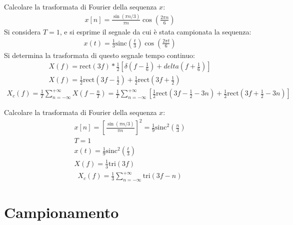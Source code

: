 \documentclass{article}
\newcommand{\rect}{\mbox{rect}}
\newcommand{\sinc}{\mbox{sinc}}
\begin{document}
Calcolare la trasformata di Fourier della sequenza $x$:
\begin{gather*}
    x[n]=\displaystyle\frac{\sin(\pi n/3)}{\pi n}\cos\left(\frac{2\pi n}{6}\right)
\end{gather*}
Si considera $T=1$, e si esprime il segnale da cui è stata campionata la sequenza:
\begin{gather*}
    x(t)=\frac{1}{3}\sinc\left(\frac{t}{3}\right)\cos\left(\frac{2\pi t}{6}\right)
\end{gather*}
Si determina la trasformata di questo segnale tempo continuo:
\begin{gather*}
    X(f)=\displaystyle\rect(3f)*\frac{1}{2}\left[\delta\left(f-\frac{1}{6}\right)+delta\left(f+\frac{1}{6}\right)\right]\\
    X(f)=\displaystyle\frac{1}{2}\rect\left(3f-\frac{1}{2}\right)+\frac{1}{2}\rect\left(3f+\frac{1}{2}\right)
\end{gather*}
\begin{gather}
    X_c(f)=\displaystyle\frac{1}{T}\sum_{n=-\infty}^{+\infty}X\left(f-\frac{n}{T}\right)=\frac{1}{T}\sum_{n=-\infty}^{+\infty}\left[\frac{1}{2}\rect\left(3f-\frac{1}{2}-3n\right)+\frac{1}{2}\rect\left(3f+\frac{1}{2}-3n\right)\right]
\end{gather}



Calcolare la trasformata di Fourier della sequenza $x$:
\begin{gather*}
    x[n]=\left[\displaystyle\frac{\sin(\pi n/3)}{\pi n}\right]^2=\frac{1}{9}\sinc^2\left(\frac{n}{3}\right)\\
    T=1\\
    x(t)=\displaystyle\frac{1}{9}\sinc^2\left(\frac{t}{3}\right)\\
    X(f)=\displaystyle \frac{1}{3}\mbox{tri}(3f)
\end{gather*}
\begin{gather}
    X_c(f)=\displaystyle\frac{1}{3}\sum_{n=-\infty}^{+\infty}\mbox{tri}(3f-n)
\end{gather}

\clearpage

\section{Campionamento}
\end{document}

